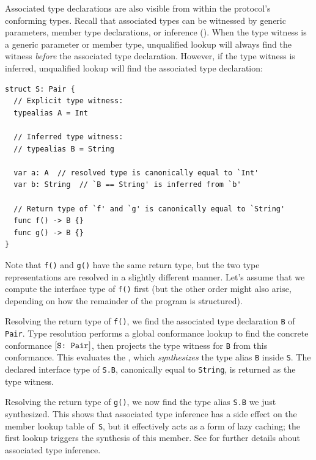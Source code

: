 \documentclass[../generics]{subfiles}
\begin{document}
Associated type declarations are also visible from within the protocol's conforming types. Recall that associated types can be witnessed by generic parameters, member type declarations, or inference (). When the type witness is a generic parameter or member type, unqualified lookup will always find the witness \emph{before} the associated type declaration. However, if the type witness is inferred, unqualified lookup will find the associated type declaration:
\begin{Verbatim}
struct S: Pair {
  // Explicit type witness:
  typealias A = Int

  // Inferred type witness:
  // typealias B = String

  var a: A  // resolved type is canonically equal to `Int'
  var b: String  // `B == String' is inferred from `b'

  // Return type of `f' and `g' is canonically equal to `String'
  func f() -> B {}
  func g() -> B {}
}
\end{Verbatim}

Note that \texttt{f()} and \texttt{g()} have the same return type, but the two type representations are resolved in a slightly different manner. Let's assume that we compute the interface type of \texttt{f()} first (but the other order might also arise, depending on how the remainder of the program is structured).

Resolving the return type of \texttt{f()}, we find the associated type declaration \texttt{B} of \texttt{Pair}. Type resolution performs a global conformance lookup to find the concrete conformance $[\texttt{S:~Pair}]$, then projects the type witness for \texttt{B} from this conformance. This evaluates the , which \emph{synthesizes} the type alias \texttt{B} inside \texttt{S}. The declared interface type of \texttt{S.B}, canonically equal to \texttt{String}, is returned as the type witness.

Resolving the return type of \texttt{g()}, we now find the type alias \texttt{S.B} we just synthesized. This shows that associated type inference has a side effect on the member lookup table of~\texttt{S}, but it effectively acts as a form of lazy caching; the first lookup triggers the synthesis of this member. See  for further details about associated type inference.
\end{document}
